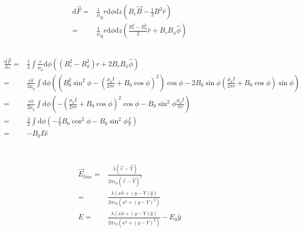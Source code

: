 \documentclass[10pt,fleqn]{article}
\newcommand{\ud}{\mathrm{d}}
\newcommand{\eqar}[1]
{
  \begin{align*}
    #1
  \end{align*}
}
\newcommand{\paren}[1]{{\left({#1}\right)}}
\newcommand{\diff}[3][{}]{{\frac{\ud^{#1} {#2}}{\ud {#3}{}^{#1}}}}
\begin{document}
\subsection{}
\eqar{
  \ud\vec F=&\frac1\mu_0r\ud\phi\ud z\paren{B_r\vec B-\frac{1}{2}B^2\hat r}\\
  =&\frac1\mu_0r\ud\phi\ud z\paren{\frac{B_r^2-B_\phi^2}2\hat r+B_rB_\phi\hat\phi}
}
\subsection{}
\eqar{
  \diff{\vec F}{z}=&\frac12\int\frac{r}{\mu_0}\ud\phi\paren{\paren{B_r^2-B_\phi^2}\hat r+2B_rB_\phi\hat\phi}\\
  =&\frac{r\hat x}{2\mu_0}\int\ud\phi\paren{\paren{B_0^2\sin^2\phi-\paren{\frac{\mu_0 I}{2\pi r}+B_0\cos\phi}^2}\cos\phi-2B_0\sin\phi\paren{\frac{\mu_0 I}{2\pi r}+B_0\cos\phi}\sin\phi}\\
  =&\frac{r\hat x}{2\mu_0}\int\ud\phi\paren{-\paren{\frac{\mu_0 I}{2\pi r}+B_0\cos\phi}^2\cos\phi-B_0\sin^2\phi\frac{\mu_0 I}{\pi r}}\\
  =&\frac{\hat x}{2}\int\ud\phi\paren{-\frac{I}{\pi}B_0\cos^2\phi-B_0\sin^2\phi\frac{I}{\pi}}\\
  =&-B_0I\hat x\\
}

\section{}
\subsection{}
\eqar{
  \vec E_{line}=&\frac{\lambda\paren{\vec r-\vec Y}}{2\pi\varepsilon_0\paren{\vec r-\vec Y}^2}\\
  =&\frac{\lambda\paren{x\hat x+\paren{y-Y}\hat y}}{2\pi\varepsilon_0\paren{x^2+\paren{y-Y}^2}}\\
  E=&\frac{\lambda\paren{x\hat x+\paren{y-Y}\hat y}}{2\pi\varepsilon_0\paren{x^2+\paren{y-Y}^2}}-E_0\hat y
}
\end{document}
